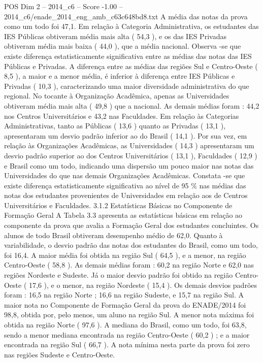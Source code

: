 \begin{textsample}{POS Dim 2 – 2014\_c6 – Score -1.00 – 2014\_c6/enade\_2014\_eng\_amb\_c63c648bd8.txt}
A média das notas da prova como um todo foi 47,1.
Em relação à Categoria Administrativa, os estudantes das IES Públicas obtiveram média mais alta ( 54,3 ), e os das IES Privadas obtiveram média mais baixa ( 44,0 ), que a média nacional.
Observa -se que existe diferença estatisticamente significativa entre as médias das notas das IES Públicas e Privadas.
A diferença entre as médias das regiões Sul e Centro-Oeste ( 8,5 ), a maior e a menor média, é inferior à diferença entre IES Públicas e Privadas ( 10,3 ), caracterizando uma maior diversidade administrativa do que regional.
No tocante à Organização Acadêmica, apenas as Universidades obtiveram média mais alta ( 49,8 ) que a nacional.
As demais médias foram : 44,2 nos Centros Universitários e 43,2 nas Faculdades.
Em relação às Categorias Administrativas, tanto as Públicas ( 13,6 ) quanto as Privadas ( 13,1 ), apresentaram um desvio padrão inferior ao do Brasil ( 14,1 ).
Por sua vez, em relação às Organizações Acadêmicas, as Universidades ( 14,3 ) apresentaram um desvio padrão superior ao dos Centros Universitários ( 13,1 ), Faculdades ( 12,9 ) e Brasil como um todo, indicando uma dispersão um pouco maior nas notas das Universidades do que nas demais Organizações Acadêmicas.
Constata -se que existe diferença estatisticamente significativa ao nível de 95 \% nas médias das notas dos estudantes provenientes de Universidades em relação aos de Centros Universitários e Faculdades. 3.1.2 Estatísticas Básicas no Componente de Formação Geral A Tabela 3.3 apresenta as estatísticas básicas em relação ao componente da prova que avalia a Formação Geral dos estudantes concluintes.
Os alunos de todo Brasil obtiveram desempenho médio de 62,0.
Quanto à variabilidade, o desvio padrão das notas dos estudantes do Brasil, como um todo, foi 16,4.
A maior média foi obtida na região Sul ( 64,5 ), e a menor, na região Centro-Oeste ( 58,8 ).
As demais médias foram : 60,2 na região Norte e 62,0 nas regiões Nordeste e Sudeste.
Já o maior desvio padrão foi obtido na região Centro-Oeste ( 17,6 ), e o menor, na região Nordeste ( 15,4 ).
Os demais desvios padrões foram : 16,5 na região Norte ; 16,6 na região Sudeste, e 15,7 na região Sul.
A maior nota no Componente de Formação Geral da prova do ENADE/2014 foi 98,8, obtida por, pelo menos, um aluno na região Sul.
A menor nota máxima foi obtida na região Norte ( 97,6 ).
A mediana do Brasil, como um todo, foi 63,8, sendo a menor mediana encontrada na região Centro-Oeste ( 60,2 ) ; e a maior encontrada na região Sul ( 66,7 ).
A nota mínima nesta parte da prova foi zero nas regiões Sudeste e Centro-Oeste.

\end{textsample}
